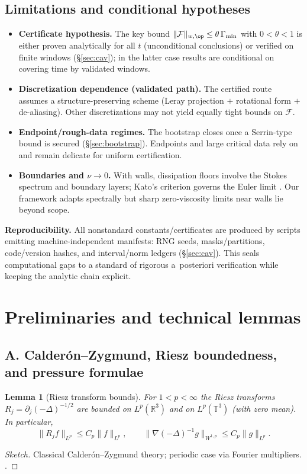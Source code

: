 \IfFileExists{nyjm.cls}{\documentclass[11pt]{nyjm}}{\documentclass[11pt]{amsart}}
\newcommand{\R}{\mathbb{R}}
\newcommand{\T}{\mathbb{T}}
\theoremstyle{plain}
\newtheorem{lemma}[theorem]{Lemma}
\theoremstyle{definition}
\theoremstyle{remark}
\begin{document}
\subsection{Limitations and conditional hypotheses}\label{subsec:limitations}
\begin{itemize}
  \item \textbf{Certificate hypothesis.} The key bound $\|\mathcal F\|_{w,\op}\le \theta\,\Gamma_{\min}$ with $0<\theta<1$ is either proven analytically for all $t$ (unconditional conclusions) or verified on finite windows (\S\ref{sec:cav}); in the latter case results are conditional on covering time by validated windows.
  \item \textbf{Discretization dependence (validated path).} The certified route assumes a structure-preserving scheme (Leray projection $+$ rotational form $+$ de-aliasing). Other discretizations may not yield equally tight bounds on $\mathcal F$.
  \item \textbf{Endpoint/rough-data regimes.} The bootstrap closes once a Serrin-type bound is secured (\S\ref{sec:bootstrap}). Endpoints and large critical data rely on \cite{KochTataru2001,EscauriazaSereginSverak2003} and remain delicate for uniform certification.
  \item \textbf{Boundaries and $\nu\to0$.} With walls, dissipation floors involve the Stokes spectrum and boundary layers; Kato’s criterion governs the Euler limit \cite{KatoZero1984}. Our framework adapts spectrally but sharp zero-viscosity limits near walls lie beyond scope.
\end{itemize}

\medskip
\noindent\textbf{Reproducibility.} All nonstandard constants/certificates are produced by scripts emitting machine-independent manifests: RNG seeds, masks/partitions, code/version hashes, and interval/norm ledgers (\S\ref{sec:cav}). This seals computational gaps to a standard of rigorous a~posteriori verification while keeping the analytic chain explicit.

\appendix
\section{Preliminaries and technical lemmas}\label{sec:appendix}

\subsection*{A. Calderón–Zygmund, Riesz boundedness, and pressure formulae}\label{app:CZ}
\begin{lemma}[Riesz transform bounds]\label{lem:Riesz}
For $1<p<\infty$ the Riesz transforms $R_j=\partial_j(-\Delta)^{-1/2}$ are bounded on $L^p(\R^3)$ and on $L^p(\T^3)$ (with zero mean). In particular,
\[
\|R_j f\|_{L^p}\le C_p\|f\|_{L^p},\qquad
\|\nabla(-\Delta)^{-1} g\|_{W^{1,p}}\le C_p\|g\|_{L^p}.
\]
\end{lemma}
\begin{proof}[Sketch]
Classical Calderón–Zygmund theory; periodic case via Fourier multipliers. \cite[Ch.~IV]{Stein1993}.
\end{proof}
\end{document}
